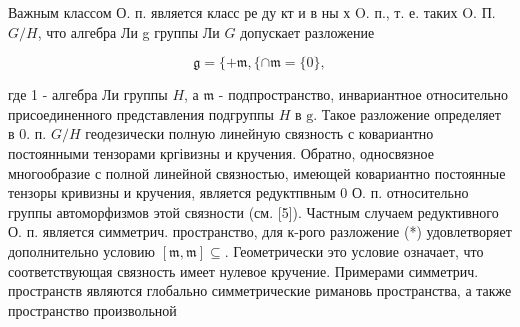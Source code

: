 \documentclass[10pt]{article}
\begin{document}
Важным классом О. п. является класс ре ду кт и в ны х O. п., т. е. таких O. П. $G / H$, что алгебра Ли g группы Ли $G$ допускает разложение



\[

\mathfrak{g}=\{+\mathfrak{m},\{\cap \mathfrak{m}=\{0\},

\]



где 1 - алгебра Ли группы $H$, а $\mathfrak{m}$ - подпространство, инвариантное относительно присоединенного представления подгруппы $H$ в $\mathrm{g}$. Такое разложение определяет в 0. п. $G / H$ геодезически полную линейную связность с ковариантно постоянными тензорами кргівизны и кручения. Обратно, односвязное многообразие с полной линейной связностью, имеющей ковариантно постоянные тензоры кривизны и кручения, является редуктпвным 0 О. п. относительно группы автоморфизмов этой связности (см. [5]). Частным случаем редуктивного О. п. является симметрич. пространство, для к-рого разложение (*) удовлетворяет дополнительно условию $[\mathfrak{m}, \mathfrak{m}] \subseteq$. Геометрически это условие означает, что соответствующая связность имеет нулевое кручение. Примерами симметрич. пространств являются глобально симметрические римановь пространства, а также пространство произвольной
\end{document}
